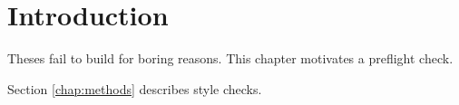 \chapter{Introduction}
\label{chap:intro}

Theses fail to build for boring reasons.
This chapter motivates a preflight check.

Section \ref{chap:methods} describes \citeauthor{lamport1994} style checks.
